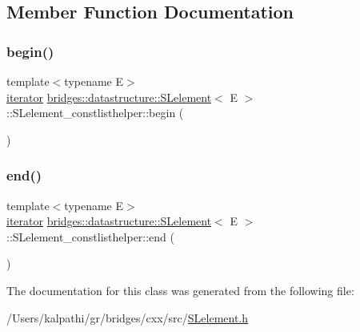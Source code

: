 \subsection{Member Function Documentation}
\mbox{\label{classbridges_1_1datastructure_1_1_s_lelement_1_1_s_lelement__constlisthelper_a2e2adc3b30f68514a90af399f47624ac}} 
\subsubsection{\texorpdfstring{begin()}{begin()}}
{\footnotesize\ttfamily template$<$typename E$>$ \\
\mbox{\hyperlink{classbridges_1_1datastructure_1_1_s_lelement_1_1_s_lelement__constlisthelper_1_1iterator}{iterator}} \mbox{\hyperlink{classbridges_1_1datastructure_1_1_s_lelement}{bridges\+::datastructure\+::\+S\+Lelement}}$<$ E $>$\+::S\+Lelement\+\_\+constlisthelper\+::begin (\begin{DoxyParamCaption}{ }\end{DoxyParamCaption})\hspace{0.3cm}{\ttfamily [inline]}}

\mbox{\label{classbridges_1_1datastructure_1_1_s_lelement_1_1_s_lelement__constlisthelper_a4ec5e5fe4b53638dfada78d44c7dd5b2}} 
\subsubsection{\texorpdfstring{end()}{end()}}
{\footnotesize\ttfamily template$<$typename E$>$ \\
\mbox{\hyperlink{classbridges_1_1datastructure_1_1_s_lelement_1_1_s_lelement__constlisthelper_1_1iterator}{iterator}} \mbox{\hyperlink{classbridges_1_1datastructure_1_1_s_lelement}{bridges\+::datastructure\+::\+S\+Lelement}}$<$ E $>$\+::S\+Lelement\+\_\+constlisthelper\+::end (\begin{DoxyParamCaption}{ }\end{DoxyParamCaption})\hspace{0.3cm}{\ttfamily [inline]}}



The documentation for this class was generated from the following file\+:\begin{DoxyCompactItemize}
\item 
/\+Users/kalpathi/gr/bridges/cxx/src/\mbox{\hyperlink{_s_lelement_8h}{S\+Lelement.\+h}}\end{DoxyCompactItemize}
